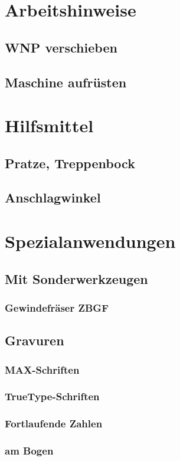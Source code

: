 \documentclass[a4paper]{book}
\begin{document}
	\section{Arbeitshinweise}
		\subsection{WNP verschieben} 
		\subsection{Maschine aufrüsten}
	\section{Hilfsmittel} 
		\subsection{Pratze, Treppenbock} 
		\subsection{Anschlagwinkel} 		 
	\section{Spezialanwendungen} 
		\subsection{Mit Sonderwerkzeugen}
			\subsubsection{Gewindefräser ZBGF} 
		\subsection{Gravuren} 
			\subsubsection{MAX-Schriften} 
			\subsubsection{TrueType-Schriften} 
			\subsubsection{Fortlaufende Zahlen}
			\subsubsection{am Bogen}
\end{document}
